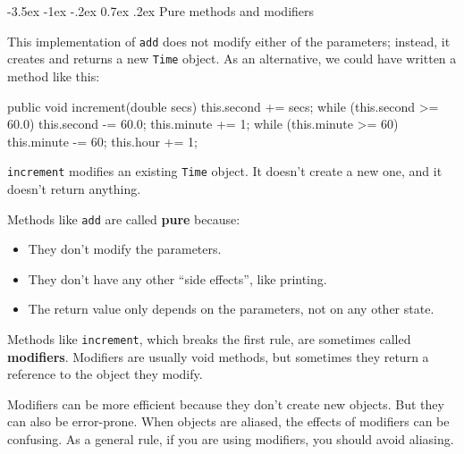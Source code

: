 \documentclass[12pt]{book}
\makeatletter
\theoremstyle{exercise}
\newcommand{\java}[1]{\verb"#1"}
\renewcommand{\section}{\@startsection{section}{1}{\z@}%
    {-3.5ex \@plus -1ex \@minus -.2ex}%
    {0.7ex \@plus.2ex}%
    {\normalfont\Large\bfseries}}
\newcommand{\java}[1]{\lstinline{#1}} %
\makeatother
\begin{document}
\section{Pure methods and modifiers}

This implementation of \java{add} does not modify either of the parameters; instead, it creates and returns a new \java{Time} object.
As an alternative, we could have written a method like this:

\begin{code}
    public void increment(double secs) {
        this.second += secs;
        while (this.second >= 60.0) {
            this.second -= 60.0;
            this.minute += 1;
        }
        while (this.minute >= 60) {
            this.minute -= 60;
            this.hour += 1;
        }
    }
\end{code}

\java{increment} modifies an existing \java{Time} object.
It doesn't create a new one, and it doesn't return anything.


Methods like \java{add} are called {\bf pure} because:

\begin{itemize}
\item They don't modify the parameters.
\item They don't have any other ``side effects'', like printing.
\item The return value only depends on the parameters, not on any other state.
\end{itemize}

Methods like \java{increment}, which breaks the first rule, are sometimes called {\bf modifiers}.
Modifiers are usually void methods, but sometimes they return a reference to the object they modify.


Modifiers can be more efficient because they don't create new objects.
But they can also be error-prone.
When objects are aliased, the effects of modifiers can be confusing.
As a general rule, if you are using modifiers, you should avoid aliasing.



\end{document}
